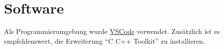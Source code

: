 \section{Software}
\label{sec:reference:software}

Als Programmierumgebung wurde \href{https://code.visualstudio.com/}{VSCode} verwendet. Zusätzlich ist es empfehlenswert, die Erweiterung ``C C++ Toolkit'' zu installieren.


